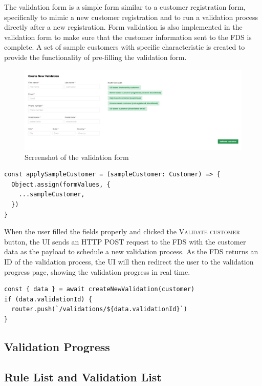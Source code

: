     The validation form is a simple form similar to a customer registration form, specifically to mimic a new customer registration and to run a validation process directly after a new registration. Form validation is also implemented in the validation form to make sure that the customer information sent to the FDS is complete. A set of sample customers with specific characteristic is created to provide the functionality of pre-filling the validation form. 

    \begin{figure}[!ht]
      \includegraphics[width=\textwidth]{images/ss_validation_form.jpeg}
      \caption{Screenshot of the validation form}
    \end{figure}

    \begin{lstlisting}[style=es6, caption={Prefilling form values with a sample customer data (TypeScript)}]
const applySampleCustomer = (sampleCustomer: Customer) => {
  Object.assign(formValues, {
    ...sampleCustomer,
  })
}
    \end{lstlisting}

    When the user filled the fields properly and clicked the \textsc{Validate customer} button, the UI sends an HTTP POST request to the FDS with the customer data as the payload to schedule a new validation process. As the FDS returns an ID of the validation process, the UI will then redirect the user to the validation progress page, showing the validation progress in real time. 

    \begin{lstlisting}[style=es6, caption={ (TypeScript)}]
const { data } = await createNewValidation(customer)
if (data.validationId) {
  router.push(`/validations/${data.validationId}`)
}
    \end{lstlisting}

  \subsection{Validation Progress}
  
  \subsection{Rule List and Validation List}